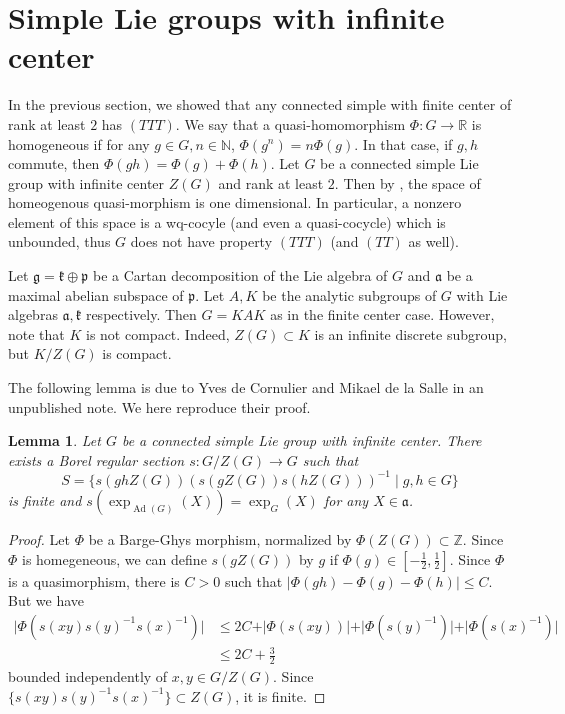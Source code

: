 \documentclass{article}
\newtheorem{lem}[theorem]{Lemma}
\theoremstyle{definition}
\theoremstyle{remark}
\numberwithin{equation}{section}
\newcommand{\R}{\mathbb{R}}
\newcommand{\N}{\mathbb{N}}
\newcommand{\Z}{\mathbb{Z}}
\DeclareMathOperator{\Ad}{Ad}
\begin{document}
\section{Simple Lie groups with infinite center}
In the previous section, we showed that any connected simple with finite center of rank at least $2$ has $(TTT)$. We say that a quasi-homomorphism $\Phi:G\to \R$ is homogeneous if for any $g\in G,n\in \N$, $\Phi(g^n)=n\Phi(g)$. In that case, if $g,h$ commute, then $\Phi(gh)=\Phi(g)+\Phi(h)$. Let $G$ be a connected simple Lie group with infinite center $Z(G)$ and rank at least $2$. Then by \cite[Prop. 6]{Barge1992},  the space of homeogenous quasi-morphism is one dimensional. In particular, a nonzero element of this space is a wq-cocyle (and even a quasi-cocycle) which is unbounded, thus $G$ does not have property $(TTT)$ (and $(TT)$ as well).\medskip

Let $\mathfrak{g}=\mathfrak{k}\oplus \mathfrak{p}$ be a Cartan decomposition of the Lie algebra of $G$ and $\mathfrak{a}$ be a maximal abelian subspace of $\mathfrak{p}$. Let $A,K$ be the analytic subgroups of $G$ with Lie algebras $\mathfrak{a},\mathfrak{k}$ respectively. Then $G=KAK$ as in the finite center case. However, note that $K$ is not compact. Indeed, $Z(G)\subset K$ is an infinite discrete subgroup, but $K/Z(G)$ is compact. 

The following lemma is due to Yves de Cornulier and Mikael de la Salle in an unpublished note. We here reproduce their proof.
\begin{lem}\label{lem:section}
    Let $G$ be a connected simple Lie group with infinite center. There exists a Borel regular section $s:G/Z(G)\to G$ such that $$S=\{s(ghZ(G))(s(gZ(G))s(hZ(G)))^{-1} \mid g,h\in G\}$$ is finite and $s(\exp_{\Ad(G)}(X))=\exp_G(X)$ for any $X\in \mathfrak{a}$.
\end{lem}
\begin{proof}
    Let $\Phi$ be a Barge-Ghys morphism, normalized by $\Phi(Z(G))\subset \Z$. Since $\Phi$ is homegeneous, we can define $s(gZ(G))$ by $g$ if $\Phi(g)\in \left[-\frac{1}{2},\frac{1}{2}\right]$. Since $\Phi$ is a quasimorphism, there is $C>0$ such that $\vert \Phi(gh)-\Phi(g)-\Phi(h)\vert \leq C$. But we have \begin{align*}
        \vert \Phi(s(xy)s(y)^{-1}s(x)^{-1}) \vert & \leq 2C + \vert \Phi(s(xy))\vert + \vert \Phi(s(y)^{-1})\vert+ \vert\Phi(s(x)^{-1})\vert\\
        & \leq 2C+\frac{3}{2}
    \end{align*}bounded independently of $x,y\in G/Z(G)$. Since $\{s(xy)s(y)^{-1}s(x)^{-1}\}\subset Z(G)$, it is finite.
\end{proof}
\end{document}
